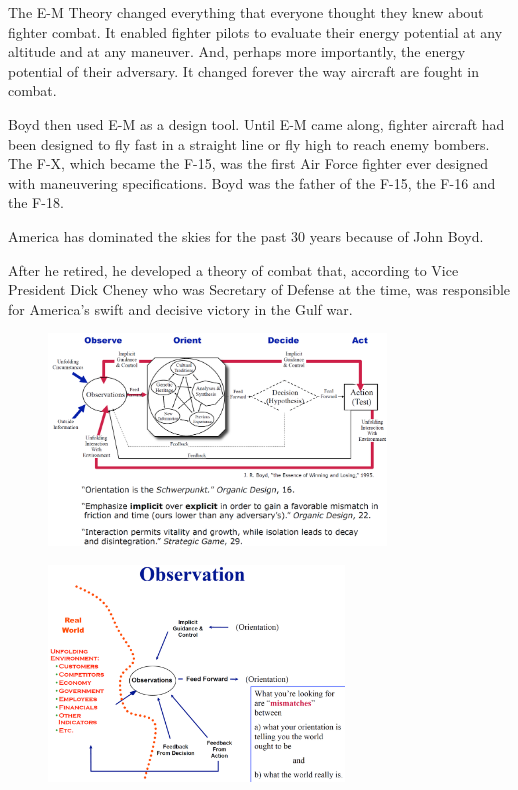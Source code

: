 \vspace{1\baselineskip}

The E-M Theory changed everything that everyone thought they knew about fighter
combat. It enabled fighter pilots to evaluate their energy potential at any
altitude and at any maneuver. And, perhaps more importantly, the energy potential
of their adversary. It changed forever the way aircraft are fought in combat.

\vspace{1\baselineskip}

Boyd then used E-M as a design tool. Until E-M came along, fighter aircraft had
been designed to fly fast in a straight line or fly high to reach enemy bombers.
The F-X, which became the F-15, was the first Air Force fighter ever designed
with maneuvering specifications. Boyd was the father of the F-15, the F-16 and
the F-18.

\vspace{1\baselineskip}

America has dominated the skies for the past 30 years because of John Boyd.

\vspace{1\baselineskip}

After he retired, he developed a theory of combat that, according to Vice
President Dick Cheney who was Secretary of Defense at the time, was
responsible for America's swift and decisive victory in the Gulf war.

\begin{figure}[H]
    \centering
    \includegraphics[width=0.8\textwidth]{Pictures/OODA.png}
\end{figure}

\begin{figure}[H]
    \centering
    \includegraphics[width=0.7\textwidth]{Pictures/Observation.png}
\end{figure}

